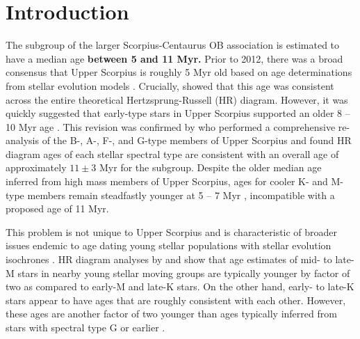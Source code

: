 \documentclass{aa}
\begin{document}

   \maketitle
%

\section{Introduction}
The  subgroup of the larger Scorpius-Centaurus OB association is estimated to have a median age {\bf between 5 and 11 Myr.} Prior to 2012, there was a broad consensus that Upper Scorpius is roughly 5 Myr old based on age determinations from stellar evolution models \citep{deGeus1992, Preibisch2002, Slesnick2008}. Crucially, \citet{Preibisch2002} showed that this age was consistent across the entire theoretical Hertzsprung-Russell (HR) diagram. However, it was quickly suggested that early-type stars in Upper Scorpius supported an older 8 -- 10 Myr age \citep{Sartori2003}. This revision was confirmed by \citet{Pecaut2012} who performed a comprehensive re-analysis of the B-, A-, F-, and G-type members of Upper Scorpius and found HR diagram ages of each stellar spectral type are consistent with an overall age of approximately $11\pm3$ Myr for the subgroup. Despite the older median age inferred from high mass members of Upper Scorpius, ages for cooler K- and M-type members remain steadfastly younger at 5 -- 7 Myr \citep[][]{Herczeg2015, Rizzuto2015, Rizzuto2015b}, incompatible with a proposed age of 11 Myr.

This problem is not unique to Upper Scorpius and is characteristic of broader issues endemic to age dating young stellar populations with stellar evolution isochrones \citep[e.g.,][]{Naylor2009, Bell2012, Herczeg2015}. HR diagram analyses by \citet{Malo2014} and \citet{Herczeg2015} show that age estimates of mid- to late-M stars in nearby young stellar moving groups are typically younger by factor of two as compared to early-M and late-K stars. On the other hand, early- to late-K stars appear to have ages that are roughly consistent with each other. However, these ages are another factor of two younger than ages typically inferred from stars with spectral type G or earlier \citep{Hillenbrand2008}. 
\end{document}
